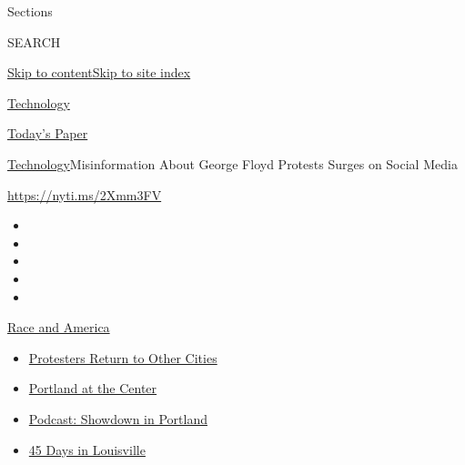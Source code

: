 Sections

SEARCH

\protect\hyperlink{site-content}{Skip to
content}\protect\hyperlink{site-index}{Skip to site index}

\href{https://www.nytimes.com/section/technology}{Technology}

\href{https://myaccount.nytimes.com/auth/login?response_type=cookie\&client_id=vi}{}

\href{https://www.nytimes.com/section/todayspaper}{Today's Paper}

\href{/section/technology}{Technology}\textbar{}Misinformation About
George Floyd Protests Surges on Social Media

\url{https://nyti.ms/2Xmm3FV}

\begin{itemize}
\item
\item
\item
\item
\item
\end{itemize}

\href{https://www.nytimes.com/news-event/george-floyd-protests-minneapolis-new-york-los-angeles?action=click\&pgtype=Article\&state=default\&region=TOP_BANNER\&context=storylines_menu}{Race
and America}

\begin{itemize}
\tightlist
\item
  \href{https://www.nytimes.com/2020/07/26/us/protests-portland-seattle-trump.html?action=click\&pgtype=Article\&state=default\&region=TOP_BANNER\&context=storylines_menu}{Protesters
  Return to Other Cities}
\item
  \href{https://www.nytimes.com/2020/07/24/us/portland-oregon-protests-white-race.html?action=click\&pgtype=Article\&state=default\&region=TOP_BANNER\&context=storylines_menu}{Portland
  at the Center}
\item
  \href{https://www.nytimes.com/2020/07/23/podcasts/the-daily/portland-protests.html?action=click\&pgtype=Article\&state=default\&region=TOP_BANNER\&context=storylines_menu}{Podcast:
  Showdown in Portland}
\item
  \href{https://www.nytimes.com/interactive/2020/07/16/us/black-lives-matter-protests-louisville-breonna-taylor.html?action=click\&pgtype=Article\&state=default\&region=TOP_BANNER\&context=storylines_menu}{45
  Days in Louisville}
\end{itemize}

